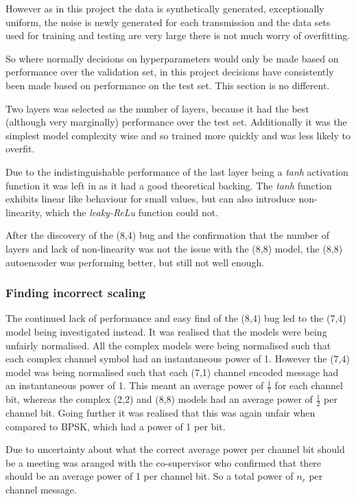 \documentclass[12pt,onecolumn,letterpaper]{article}
\newcommand{\code}{\textit}
\begin{document}
However as in this project the data is synthetically generated, exceptionally uniform, the noise is newly generated for each transmission and the data sets used for training and testing are very large there is not much worry of overfitting.

So where normally decisions on hyperparameters would only be made based on performance over the validation set, in this project decisions have consistently been made based on performance on the test set. This section is no different. 

Two layers was selected as the number of layers, because it had the best (although very marginally) performance over the test set. Additionally it was the simplest model complexity wise and so trained more quickly and was less likely to overfit.

Due to the indistinguishable performance of the last layer being a \code{tanh} activation function it was left in as it had a good theoretical backing. The \code{tanh} function exhibits linear like behaviour for small values, but can also introduce non-linearity, which the \code{leaky-ReLu} function could not.

After the discovery of the (8,4) bug and the confirmation that the number of layers and lack of non-linearity was not the issue with the (8,8) model, the (8,8) autoencoder was performing better, but still not well enough. 

\subsubsection{Finding incorrect scaling}
\label{sec:CorrectingScaling}

The continued lack of performance and easy find of the (8,4) bug led to the (7,4) model being investigated instead. It was realised that the models were being unfairly normalised. All the complex models were being normalised such that each complex channel symbol had an instantaneous power of 1. However the (7,4) model was being normalised such that each (7,1) channel encoded message had an instantaneous power of 1. This meant an average power of $\frac{1}{7}$ for each channel bit, whereas the complex (2,2) and (8,8) models had an average power of $\frac{1}{2}$ per channel bit. Going further it was realised that this was again unfair when compared to BPSK, which had a power of 1 per bit. 

Due to uncertainty about what the correct average power per channel bit should be a meeting was aranged with the co-supervisor who confirmed that there should be an average power of 1 per channel bit. So a total power of $n_r$ per channel message. 
\end{document}

